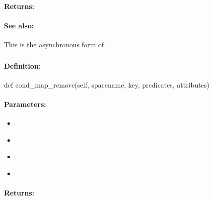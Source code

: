 \paragraph{Returns:}


\paragraph{See also:}  This is the asynchronous form of .

\pagebreak
\subsubsection{}
\label{api:python:cond_map_remove}


\paragraph{Definition:}
\begin{pythoncode}
def cond_map_remove(self, spacename, key, predicates, attributes)
\end{pythoncode}

\paragraph{Parameters:}
\begin{itemize}[noitemsep]
\item {}\\

\item {}\\

\item {}\\

\item {}\\

\end{itemize}

\paragraph{Returns:}


